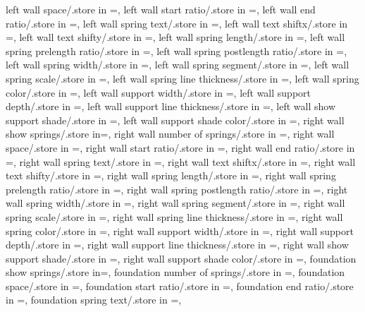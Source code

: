 {  left wall space/.store in =\leftwspringspace,
  left wall start ratio/.store in =\leftwspringstartratio,
  left wall end ratio/.store in =\leftwspringendratio,
  left wall spring text/.store in =\leftwspringtext,
  left wall text shiftx/.store in =\leftwtextshiftx,
  left wall text shifty/.store in =\leftwtextshifty,
  left wall spring length/.store in =\leftwspringlength,
  left wall spring prelength ratio/.store in =\leftwprelenratio,
  left wall spring postlength ratio/.store in =\leftwpostlenratio,
  left wall spring width/.store in =\leftwampl,
  left wall spring segment/.store in =\leftwsegm,
  left wall spring scale/.store in =\leftwspringscale,
  left wall spring line thickness/.store in =\leftwspringthk,
  left wall spring color/.store in =\leftwspringcolor,
  left wall support width/.store in =\leftwsuppwidth,
  left wall support depth/.store in =\leftwsuppdepth,
  left wall support line thickness/.store in =\leftwsupplinethk,
  left wall show support shade/.store in =\leftwshowsuppshade,
  left wall support shade color/.store in =\leftwsuppshadecol,
  right wall show springs/.store in=\rightwshowsprings,
  right wall number of springs/.store in =\rightwspringnumber,
  right wall space/.store in =\rightwspringspace,
  right wall start ratio/.store in =\rightwspringstartratio,
  right wall end ratio/.store in =\rightwspringendratio,
  right wall spring text/.store in =\rightwspringtext,
  right wall text shiftx/.store in =\rightwtextshiftx,
  right wall text shifty/.store in =\rightwtextshifty,
  right wall spring length/.store in =\rightwspringlength,
  right wall spring prelength ratio/.store in =\rightwprelenratio,
  right wall spring postlength ratio/.store in =\rightwpostlenratio,
  right wall spring width/.store in =\rightwampl,
  right wall spring segment/.store in =\rightwsegm,
  right wall spring scale/.store in =\rightwspringscale,
  right wall spring line thickness/.store in =\rightwspringthk,
  right wall spring color/.store in =\rightwspringcolor,
  right wall support width/.store in =\rightwsuppwidth,
  right wall support depth/.store in =\rightwsuppdepth,
  right wall support line thickness/.store in =\rightwsupplinethk,
  right wall show support shade/.store in =\rightwshowsuppshade,
  right wall support shade color/.store in =\rightwsuppshadecol,
  foundation show springs/.store in=\foundshowsprings,
  foundation number of springs/.store in =\foundspringnumber,
  foundation space/.store in =\foundspringspace,
  foundation start ratio/.store in =\foundspringstartratio,
  foundation end ratio/.store in =\foundspringendratio,
  foundation spring text/.store in =\foundspringtext,
}
